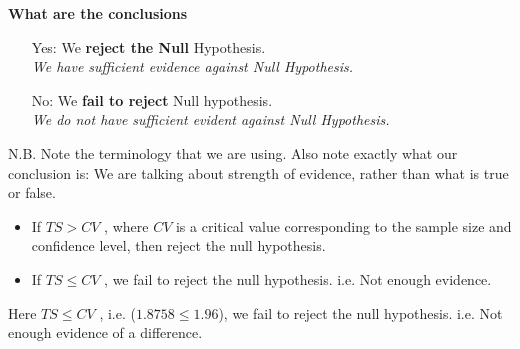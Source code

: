 \documentclass[a4paper,12pt]{article}
\begin{document}
\begin{framed}
\noindent \textbf{What are the conclusions}
\begin{itemize} 

\item[Yes:] We \textbf{reject the Null} Hypothesis. \\ \textit{We have sufficient evidence against Null Hypothesis.}

\item[No:] We \textbf{fail to reject} Null hypothesis. \\ \textit{We do not have sufficient evident against Null Hypothesis.}
\end{itemize}
{\normalsize
N.B. Note the terminology that we are using. Also note exactly what our conclusion is: We are talking about strength of evidence, rather than what is true or false.}

\end{framed}
\smallskip
\begin{framed}
\begin{itemize}
\item If $TS > CV$ , where $CV$ is a critical value corresponding to the sample size and confidence level, then reject the null hypothesis. 
\item  If $TS \leq CV$ , we fail to reject the null hypothesis. i.e. Not enough evidence. 
\end{itemize}
\end{framed}

\noindent Here $TS \leq CV$ , i.e. ($1.8758 \leq 1.96$), we fail to reject the null hypothesis. i.e. Not enough evidence of a difference. 
\end{document}
